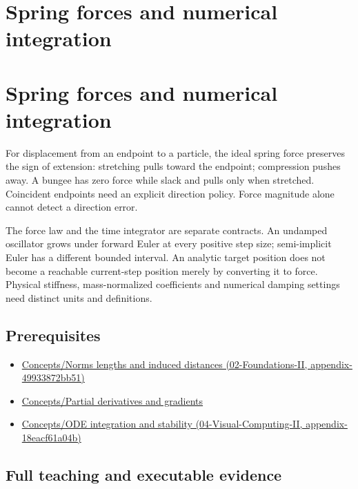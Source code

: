 \hypertarget{appendix-e040e2108923}{}
\section*{Spring forces and numerical integration}
\section{Spring forces and numerical integration}\label{appendix-e040e2108923-spring-forces-and-numerical-integration}

For displacement from an endpoint to a particle, the ideal spring force preserves the sign of extension: stretching pulls toward the endpoint; compression pushes away. A bungee has zero force while slack and pulls only when stretched. Coincident endpoints need an explicit direction policy. Force magnitude alone cannot detect a direction error.

The force law and the time integrator are separate contracts. An undamped oscillator grows under forward Euler at every positive step size; semi-implicit Euler has a different bounded interval. An analytic target position does not become a reachable current-step position merely by converting it to force. Physical stiffness, mass-normalized coefficients and numerical damping settings need distinct units and definitions.

\subsection{Prerequisites}\label{appendix-e040e2108923-prerequisites}

\begin{itemize}
\tightlist
\item
  \href{../02-Foundations-II/main.pdf\#nameddest=appendix-49933872bb51}{Concepts/Norms lengths and induced distances (02-Foundations-II, appendix-49933872bb51)}
\item
  \hyperref[appendix-677b59746ae0]{Concepts/Partial derivatives and gradients}
\item
  \href{../04-Visual-Computing-II/main.pdf\#nameddest=appendix-18eacf61a04b}{Concepts/ODE integration and stability (04-Visual-Computing-II, appendix-18eacf61a04b)}
\end{itemize}

\subsection{Full teaching and executable evidence}\label{appendix-e040e2108923-full-teaching-and-executable-evidence}

